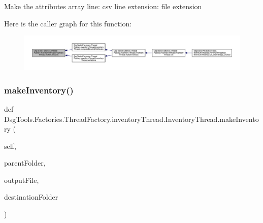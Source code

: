 \begin{DoxyVerb}Make the attributes array
line: csv line
extension: file extension
\end{DoxyVerb}
 Here is the caller graph for this function\+:
\nopagebreak
\begin{figure}[H]
\begin{center}
\leavevmode
\includegraphics[width=350pt]{class_dsg_tools_1_1_factories_1_1_thread_factory_1_1inventory_thread_1_1_inventory_thread_ab72bc1372d558d3938a4ee94ff245c0a_icgraph}
\end{center}
\end{figure}
\mbox{\label{class_dsg_tools_1_1_factories_1_1_thread_factory_1_1inventory_thread_1_1_inventory_thread_a3a79e7cbac8812c3ee82fc4cdf405149}} 
\subsubsection{\texorpdfstring{make\+Inventory()}{makeInventory()}}
{\footnotesize\ttfamily def Dsg\+Tools.\+Factories.\+Thread\+Factory.\+inventory\+Thread.\+Inventory\+Thread.\+make\+Inventory (\begin{DoxyParamCaption}\item[{}]{self,  }\item[{}]{parent\+Folder,  }\item[{}]{output\+File,  }\item[{}]{destination\+Folder }\end{DoxyParamCaption})}

